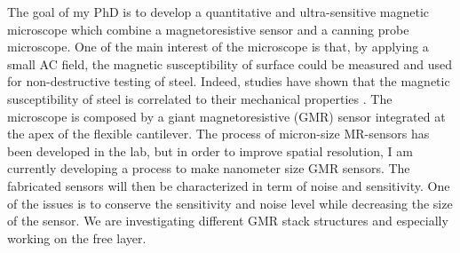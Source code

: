 The goal of my PhD is to develop a quantitative and ultra-sensitive magnetic microscope which combine a magnetoresistive sensor and a canning probe microscope. One of the main interest of the microscope is that, by applying a small AC field, the magnetic susceptibility of surface could be measured and used for non-destructive testing of steel. Indeed, studies have shown that the magnetic susceptibility of steel is correlated to their mechanical properties \cite{M_sz_ros_2006}.
The microscope is composed by a giant magnetoresistive (GMR) sensor  integrated at the apex of the flexible cantilever. The process of micron-size MR-sensors has been developed in the lab, but in order to improve spatial resolution, I am currently developing a process to make nanometer size GMR sensors.  The fabricated sensors will then be characterized  in term of noise and sensitivity. One of the issues is to conserve the sensitivity and noise level while decreasing the size of the sensor. We are investigating different GMR stack structures and especially working on the free layer.